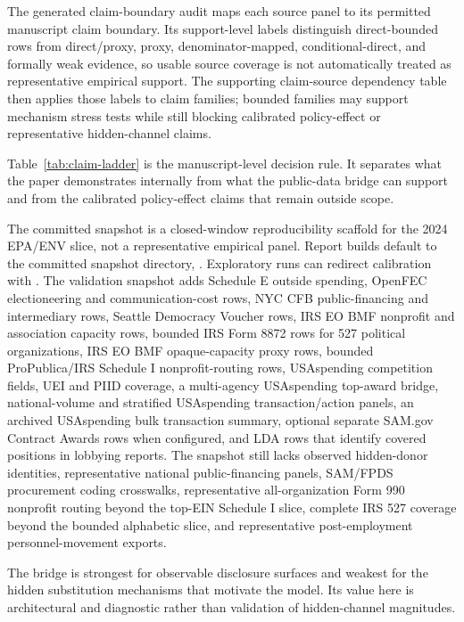 The generated claim-boundary audit maps each source panel to its permitted manuscript claim boundary. Its support-level labels distinguish direct-bounded rows from direct/proxy, proxy, denominator-mapped, conditional-direct, and formally weak evidence, so usable source coverage is not automatically treated as representative empirical support. The supporting claim-source dependency table then applies those labels to claim families; bounded families may support mechanism stress tests while still blocking calibrated policy-effect or representative hidden-channel claims.



Table~\ref{tab:claim-ladder} is the manuscript-level decision rule. It separates what the paper demonstrates internally from what the public-data bridge can support and from the calibrated policy-effect claims that remain outside scope.

The committed snapshot is a closed-window reproducibility scaffold for the 2024 EPA/ENV slice, not a representative empirical panel. Report builds default to the committed snapshot directory, . Exploratory runs can redirect calibration with . The validation snapshot adds Schedule E outside spending, OpenFEC electioneering and communication-cost rows, NYC CFB public-financing and intermediary rows, Seattle Democracy Voucher rows, IRS EO BMF nonprofit and association capacity rows, bounded IRS Form 8872 rows for 527 political organizations, IRS EO BMF opaque-capacity proxy rows, bounded ProPublica/IRS Schedule I nonprofit-routing rows, USAspending competition fields, UEI and PIID coverage, a multi-agency USAspending top-award bridge, national-volume and stratified USAspending transaction/action panels, an archived USAspending bulk transaction summary, optional separate SAM.gov Contract Awards rows when configured, and LDA rows that identify covered positions in lobbying reports. The snapshot still lacks observed hidden-donor identities, representative national public-financing panels, SAM/FPDS procurement coding crosswalks, representative all-organization Form 990 nonprofit routing beyond the top-EIN Schedule I slice, complete IRS 527 coverage beyond the bounded alphabetic slice, and representative post-employment personnel-movement exports.

The bridge is strongest for observable disclosure surfaces and weakest for the hidden substitution mechanisms that motivate the model. Its value here is architectural and diagnostic rather than validation of hidden-channel magnitudes.

